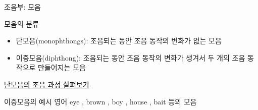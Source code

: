 \documentclass[11pt, aspectratio=169]{beamer}
\newcommand{\textds}[1]{{\ipafont #1}}
\begin{document}
\begin{frame}[t]{조음부: 모음}
    \begin{block}{모음의 분류}
        \begin{itemize}
            \item 단모음(monophthongs): 조음되는 동안 조음 동작의 변화가 없는 모음
            \item 이중모음(diphthong): 조음되는 동안 조음 동작의 변화가 생겨서 두 개의 조음 동작으로 만들어지는 모음
        \end{itemize}
    \end{block}    
     \href{https://seeingspeech.ac.uk}{\underline{단모음의 조음 과정 살펴보기}}

    \begin{block}{이중모음의 예시}
        영어 eye \textds{[aɪ]}, brown \textds{[aʊ]}, boy \textds{[ɔɪ]}, house \textds{[oʊ]}, bait \textds{[eɪ]} 등의 모음
    \end{block}

\end{frame}
\end{document}
